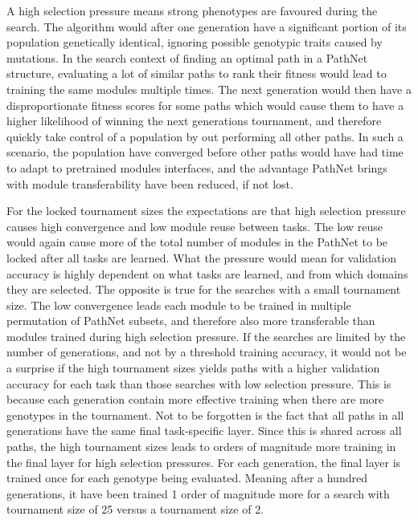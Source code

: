 A high selection pressure means strong phenotypes are favoured during the search. The algorithm would after one generation have a significant portion of its population genetically identical, ignoring possible genotypic traits caused by mutations. In the search context of finding an optimal path in a PathNet structure, evaluating a lot of similar paths to rank their fitness would lead to training the same modules multiple times. The next generation would then have a disproportionate fitness scores for some paths which would cause them to have a higher likelihood of winning the next generations tournament, and therefore quickly take control of a population by out performing all other paths. In such a scenario, the population have converged before other paths would have had time to adapt to pretrained modules interfaces, and the advantage PathNet brings with module transferability have been reduced, if not lost.  

For the locked tournament sizes the expectations are that high selection pressure causes high convergence and low module reuse between tasks. The low reuse would again cause more of the total number of modules in the PathNet to be locked after all tasks are learned. What the pressure would mean for validation accuracy is highly dependent on what tasks are learned, and from which domains they are selected. 
The opposite is true for the searches with a small tournament size. The low convergence leads each module to be trained in multiple permutation of PathNet subsets, and therefore also more transferable than modules trained during high selection pressure. If the searches are limited by the number of generations, and not by a threshold training accuracy, it would not be a surprise if the high tournament sizes yields paths with a higher validation accuracy for each task than those searches with low selection pressure. This is because each generation contain more effective training when there are more genotypes in the tournament. Not to be forgotten is the fact that all paths in all generations have the same final task-specific layer.  Since this is shared across all paths, the high tournament sizes leads to orders of magnitude more training in the final layer for high selection pressures. For each generation, the final layer is trained once for each genotype being evaluated. Meaning after a hundred generations, it have been trained 1 order of magnitude more for a search with tournament size of 25 versus a tournament size of 2. 


